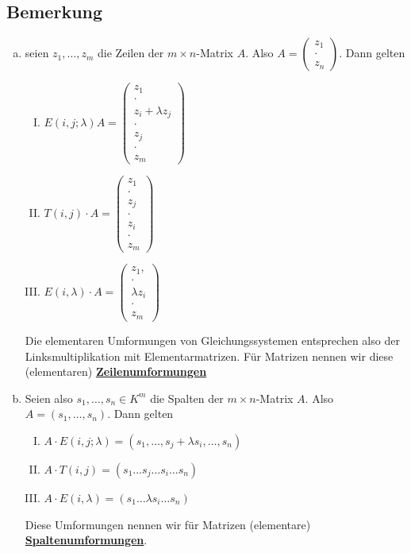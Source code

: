\subsection{Bemerkung} %
\label{sub:bemerkung}
\begin{enumerate}[a)]
	\item seien $z_1, \ldots , z_m$ die Zeilen der \(m \times n \)-Matrix  $A$. Also $A= \begin{pmatrix}
		z_1 \\ \cdot \\ z_n
	\end{pmatrix}$. Dann gelten
	\begin{enumerate}[I)]
		\item $E(i,j; \lambda )A = \begin{pmatrix}
			z_1 \\ \cdot \\ z_i + \lambda z_j \\ \cdot \\ z_j \\ \cdot \\ z_m
		\end{pmatrix}$
		\item  $T(i,j) \cdot A = \begin{pmatrix}
			z_1 \\ \cdot \\ z_j \\ \cdot \\ z_i \\ \cdot \\ z_m
		\end{pmatrix}$
		\item  $E(i, \lambda ) \cdot A = \begin{pmatrix}
			z_1, \\ \cdot \\ \lambda z_i \\ \cdot \\ z_m
		\end{pmatrix}$
	\end{enumerate}
	Die elementaren Umformungen von Gleichungssystemen entsprechen also der Linksmultiplikation mit Elementarmatrizen. Für Matrizen nennen wir diese
	(elementaren) \underline{\textbf{Zeilenumformungen}}
	\item Seien also $s_1, \ldots , s_n \in K^m$ die Spalten der \(m \times n \)-Matrix $A$. Also $A= (s_1, \ldots , s_n)$. Dann gelten
	\begin{enumerate}[I)]
		\item $A \cdot E(i,j; \lambda ) = (s_1, \ldots , s_j + \lambda s_i , \ldots , s_n)$
		\item $A \cdot T(i,j) = (s_1 \ldots  s_j  \ldots  s_i  \ldots  s_n)$
		\item $A \cdot E(i, \lambda ) = (s_1 \ldots  \lambda s_i \ldots s_n)$
	\end{enumerate}
	Diese Umformungen nennen wir  für Matrizen (elementare) \underline{\textbf{Spaltenumformungen}}.
\end{enumerate}

